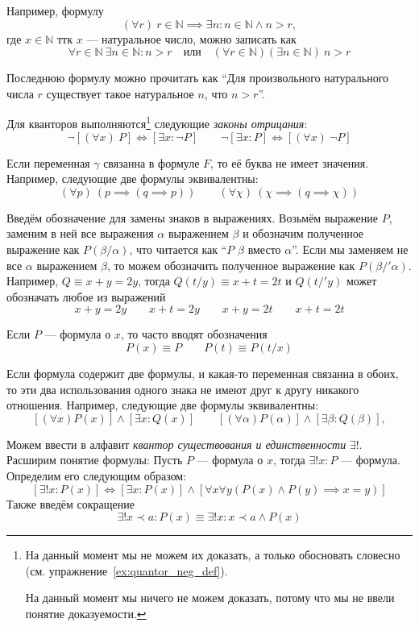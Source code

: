 Например, формулу
\newcommand\N{\mathbb N}
\[
	(\forall r)~r\in\N\implies \exists n:n\in\N\land n>r,
\]
где $x\in\N$ ттк $x$ --- натуральное число, можно записать как
\[
	\forall r\in\N~\exists n\in\N:n>r\quad\text{или}\quad
	(\forall r\in\N)(\exists n\in\N)~n>r
\]

Последнюю формулу можно прочитать как ``Для произвольного натурального числа
$r$ существует такое натуральное $n$, что $n>r$''.

Для кванторов выполняются\footnote{
	На данный момент мы не можем их доказать, а только
	обосновать словесно (см. упражнение~\ref{ex:quantor_neg_def}).

	На данный момент мы ничего не можем доказать, потому что мы не ввели
	понятие доказуемости.}
следующие {\it законы отрицания}:
\[
	\lnot[(\forall x)~P]\iff[\exists x:\lnot P]\qquad
	\lnot[\exists x:P]\iff[(\forall x)~\lnot P]
\]

Если переменная $\gamma$ связанна в формуле $F$, то её буква не имеет значения.
Например, следующие две формулы эквивалентны:
\[
	(\forall p)~(p\implies (q\implies p))\qquad
	(\forall \chi)~(\chi\implies (q\implies\chi))
\]

Введём обозначение для замены знаков в выражениях.
Возьмём выражение $P$, заменим в ней все выражения $\alpha$ выражением $\beta$ и
обозначим полученное выражение как $P(\beta/\alpha)$, что читается как
``$P$ $\beta$ вместо $\alpha$''.
Если мы заменяем не все $\alpha$ выражением $\beta$, то можем обозначить полученное
выражение как $P(\beta/'\alpha)$.
Например, $Q\equiv x+y=2y$, тогда $Q(t/y)\equiv x+t=2t$ и $Q(t/'y)$ может
обозначать любое из выражений
\[
	x+y=2y\qquad x+t=2y\qquad x+y=2t\qquad x+t=2t
\]

Если $P$ --- формула о $x$, то часто вводят обозначения
\[
	P(x)\equiv P\qquad P(t)\equiv P(t/x)
\]

Если формула содержит две формулы, и какая-то переменная
связанна в обоих, то эти два использования
одного знака не имеют друг к другу никакого отношения.
Например, следующие две формулы эквивалентны:
\[
	[(\forall x)P(x)]\land[\exists x:Q(x)]\qquad
	[(\forall \alpha)P(\alpha)]\land[\exists \beta:Q(\beta)],
\]

\label{page:exists_only}
Можем ввести в алфавит {\it квантор существования и единственности}
 $\exists!$.
Расширим понятие формулы: Пусть $P$ --- формула о $x$,
тогда ${\exists! x:P}$ --- формула. Определим его следующим образом:
\[
	[\exists! x:P(x)]\iff[\exists x:P(x)]\land
	[\forall x\forall y(P(x)\land P(y)\implies x=y)]
\]
Также введём сокращение
\[
	\exists! x\prec a:P(x)\equiv \exists! x:x\prec a\land P(x)
\]

